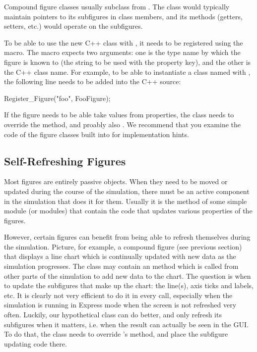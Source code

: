 Compound figure classes usually subclass from .
The class would typically maintain pointers to its subfigures in
class members, and its methods (getters, setters, etc.) would operate
on the subfigures.

To be able to use the new C++ class with ,
it needs to be registered using the  macro.
The macro expects two arguments: one is the type name by which the figure
is known to  (the string to be used with the  property key),
and the other is the C++ class name. For example, to be able to instantiate
a class named  with ,
the following line needs to be added into the C++ source:

\begin{cpp}
Register_Figure("foo", FooFigure);
\end{cpp}

If the figure needs to be able take values from  properties,
the class needs to override the  method,
and proably also . We recommend that
you examine the code of the figure classes built into {\opp} for
implementation hints.



\subsection{Self-Refreshing Figures}
\label{sec:graphics:self-refreshing-figures}

Most figures are entirely passive objects. When they need to be moved
or updated during the course of the simulation, there must be an
active component in the simulation that does it for them. Usually it is the
 method of some simple module (or modules) that
contain the code that updates various properties of the figures.

However, certain figures can benefit from being able to refresh themselves
during the simulation. Picture, for example, a compound figure (see
previous section) that displays a line chart which is continually
updated with new data as the simulation progresses. The 
class may contain an  method which is called
from other parts of the simulation to add new data to the chart.
The question is when to update the subfigures that make up the chart: the
line(s), axis ticks and labels, etc. It is clearly not very efficient
to do it in every  call, especially when the
simulation is running in Express mode when the screen is not refreshed
very often. Luckily, our hypothetical  class
can do better, and only refresh its subfigures when it matters, i.e.
when the result can actually be seen in the GUI. To do that, the class
needs to override 's  method, and
place the subfigure updating code there.

